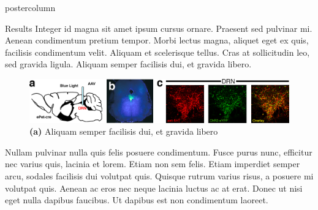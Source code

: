 \documentclass{beamer}
\newlength{\columnheight}
\begin{document}
\begin{frame}
\begin{columns}
	
	\begin{column}{.57\textwidth}
		\begin{beamercolorbox}[center]{postercolumn}
			\begin{minipage}{.98\textwidth} %
				\parbox[t][\columnheight]{\textwidth}{ %
					\begin{myblock}{Results}
						Integer id magna sit amet ipsum cursus ornare. Praesent sed pulvinar mi. Aenean condimentum pretium tempor. Morbi lectus magna, aliquet eget ex quis, facilisis condimentum velit. Aliquam et scelerisque tellus. Cras at sollicitudin leo, sed gravida ligula. Aliquam semper facilisis dui, et gravida libero. 
						\vspace{0.2em}
						\begin{figure}
							\begin{minipage}{.94\textwidth}
								\centering\includegraphics[width=\textwidth]{img/og.png}
								\caption{\textbf{(a)}  Aliquam semper facilisis dui, et gravida libero}
							\end{minipage}
						\end{figure}
						\vspace{0.4em}
						Nullam pulvinar nulla quis felis posuere condimentum. Fusce purus nunc, efficitur nec varius quis, lacinia et lorem. Etiam non sem felis. Etiam imperdiet semper arcu, sodales facilisis dui volutpat quis. Quisque rutrum varius risus, a posuere mi volutpat quis. Aenean ac eros nec neque lacinia luctus ac at erat. Donec ut nisi eget nulla dapibus faucibus. Ut dapibus est non condimentum laoreet. 


\end{myblock}}
\end{minipage}
\end{beamercolorbox}
\end{column}
\end{columns}
\end{frame}
\end{document}

